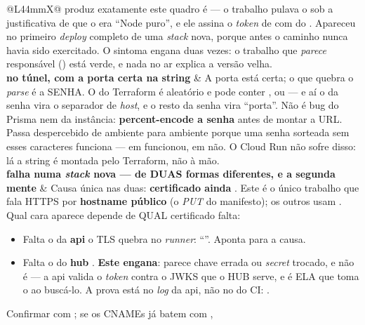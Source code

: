 \begin{tabularx}{\linewidth}{@{}L{44mm}X@{}}
  produz exatamente este quadro é
   --- o trabalho
  pulava o  sob a justificativa de que o
   era \enquote{Node puro}, e ele assina o
  \emph{token} de  com  do .
  Apareceu no primeiro \emph{deploy} completo de uma \emph{stack} nova, porque
  antes o caminho nunca havia sido exercitado. O sintoma engana duas vezes: o
  trabalho que \emph{parece} responsável () está verde, e
  nada no ar explica a versão velha.\\
\zebra \textbf{ no túnel, com
a porta certa na string} &
  A porta está certa; o que quebra o \emph{parse} é a SENHA. O
   do Terraform é aleatório e pode conter , \cd{:} ou
  \cd{/} --- e aí o  da senha vira o separador de \emph{host}, e o
  resto da senha vira \enquote{porta}. Não é bug do Prisma nem da instância:
  \textbf{percent-encode a senha} antes de montar a URL. Passa despercebido de
  ambiente para ambiente porque uma senha sorteada sem esses caracteres funciona
  --- em  funcionou, em  não. O Cloud Run não sofre disso: lá a
  string é montada pelo Terraform, não à mão.\\
\textbf{ falha numa \emph{stack} nova --- de DUAS formas
diferentes, e a segunda mente} &
  Causa única nas duas: \textbf{certificado ainda }. Este é o
  único trabalho que fala HTTPS por \textbf{hostname público} (o \emph{PUT} do
  manifesto); os outros usam . Qual cara aparece depende de QUAL
  certificado falta:
  \begin{itemize}[leftmargin=*, nosep]
    \item Falta o da \textbf{api} \seta{} o TLS quebra no \emph{runner}:
       \seta{}
      \enquote{}. Aponta para a
      causa.
    \item Falta o do \textbf{hub} \seta{}
      . \textbf{Este engana}: parece
      chave errada ou \emph{secret} trocado, e não é --- a api valida o
      \emph{token} contra o JWKS que o HUB serve, e é ELA que toma o
       ao buscá-lo. A prova está no \emph{log} da api, não no do
      CI: .
  \end{itemize}
  Confirmar com ; se os CNAMEs
   já batem com ,

\end{tabularx}
